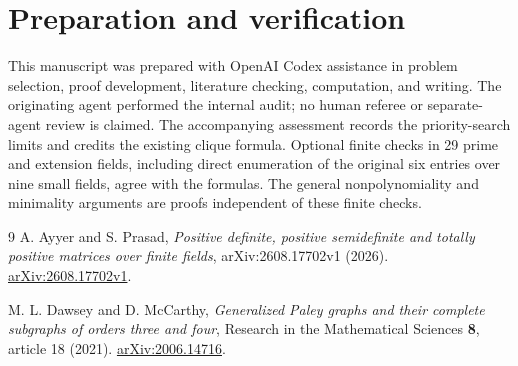 \documentclass[11pt]{article}
\begin{document}
\section*{Preparation and verification}
This manuscript was prepared with OpenAI Codex assistance in problem selection, proof development, literature checking, computation, and writing. The originating agent performed the internal audit; no human referee or separate-agent review is claimed. The accompanying assessment records the priority-search limits and credits the existing clique formula. Optional finite checks in 29 prime and extension fields, including direct enumeration of the original six entries over nine small fields, agree with the formulas. The general nonpolynomiality and minimality arguments are proofs independent of these finite checks.

\begin{thebibliography}{9}
A. Ayyer and S. Prasad,
\emph{Positive definite, positive semidefinite and totally positive matrices over finite fields},
arXiv:2608.17702v1 (2026).
\href{https://arxiv.org/abs/2608.17702v1}{arXiv:2608.17702v1}.

M. L. Dawsey and D. McCarthy,
\emph{Generalized Paley graphs and their complete subgraphs of orders three and four},
Research in the Mathematical Sciences \textbf{8}, article 18 (2021).
\href{https://arxiv.org/abs/2006.14716}{arXiv:2006.14716}.
\end{thebibliography}
\end{document}
